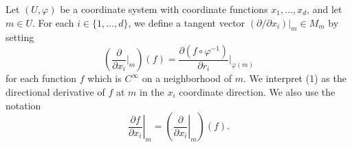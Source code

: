 \begin{definition}\label{thm:1.19}
	Let $(U,\varphi)$ be a coordinate system with coordinate functions $x_{1},\ldots,x_{d}$, and let $m\in U$. For each $i\in\{1,\ldots,d\}$, we define a tangent vector  $ (\partial/\partial x_i)|_{m} \in M_m $ by setting
	\begin{equation}
		\label{eq:1.19:1}
		\left(\frac{\partial}{\partial x_{i}}\bigg\vert_{m}\right)(f)=\frac{\partial(f\circ\varphi^{-1})}{\partial r_{i}}\bigg\vert_{\varphi(m)}
	\end{equation}
	for each function $f$ which is $C^{\infty}$ on a neighborhood of $m$. We interpret (1) as the directional derivative of $f$ at $m$ in the $x_{i}$ coordinate direction. We also use the notation
	\begin{equation}
		\label{eq:1.19:2}
		\left.\frac{\partial f}{\partial x_{i}}\right|_{m}=\left(\left.\frac{\partial}{\partial x_{i}}\right|_{m}\right)(f).
	\end{equation}
	\begin{center}
	\end{center}

\end{definition}

